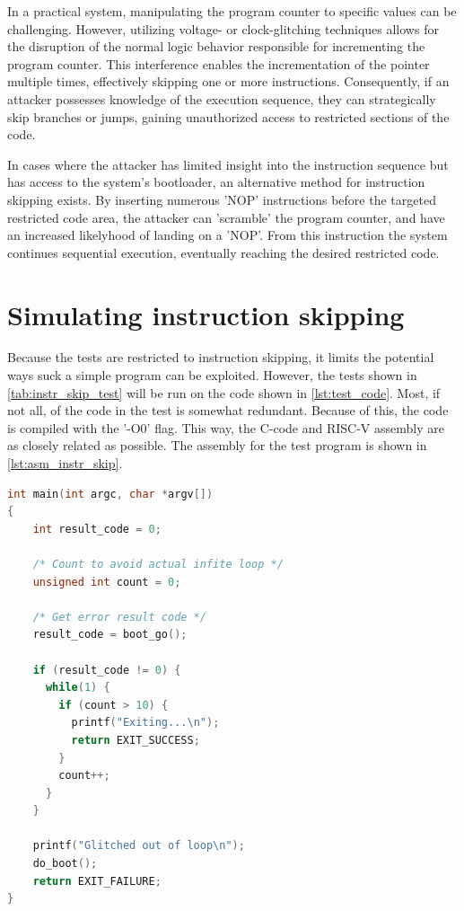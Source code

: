In a practical system, manipulating the program counter to specific values can be challenging. However, utilizing voltage- or clock-glitching techniques allows for the disruption of the normal logic behavior responsible for incrementing the program counter. This interference enables the incrementation of the pointer multiple times, effectively skipping one or more instructions. Consequently, if an attacker possesses knowledge of the execution sequence, they can strategically skip branches or jumps, gaining unauthorized access to restricted sections of the code.

In cases where the attacker has limited insight into the instruction sequence but has access to the system's bootloader, an alternative method for instruction skipping exists. By inserting numerous 'NOP' instructions before the targeted restricted code area, the attacker can 'scramble' the program counter, and have an increased likelyhood of landing on a 'NOP'. From this instruction the system continues sequential execution, eventually reaching the desired restricted code.

\section{Simulating instruction skipping}
\label{sec:sim_instr_skip}

Because the tests are restricted to instruction skipping, it limits the potential ways suck a simple program can be exploited. However, the tests shown in \autoref{tab:instr_skip_test} will be run on the code shown in \autoref{lst:test_code}. Most, if not all, of the code in the test is somewhat redundant. Because of this, the code is compiled with the '-O0' flag. This way, the C-code and RISC-V assembly are as closely related as possible. The assembly for the test program is shown in \autoref{lst:asm_instr_skip}. 

\begin{lstlisting}[caption={A sample C++ code}, label=lst:test_code, language=C++]
int main(int argc, char *argv[])
{
    int result_code = 0;

    /* Count to avoid actual infite loop */
    unsigned int count = 0;

    /* Get error result code */
    result_code = boot_go();

    if (result_code != 0) {
      while(1) {
       	if (count > 10)	{
          printf("Exiting...\n");
       	  return EXIT_SUCCESS;
        }
        count++;
      }
    }

    printf("Glitched out of loop\n");
    do_boot();
    return EXIT_FAILURE;
}
\end{lstlisting}

